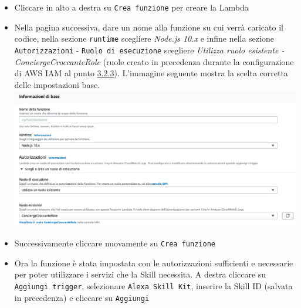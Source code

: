 \begin{itemize}
	\item Cliccare in alto a destra su \texttt{Crea funzione} per creare la Lambda
	\item Nella pagina successiva, dare un nome alla funzione su cui verrà caricato il codice, nella sezione \texttt{runtime} scegliere \textit{Node.js 10.x} e infine nella sezione \texttt{Autorizzazioni} - \texttt{Ruolo di esecuzione} scegliere \textit{Utilizza ruolo esistente - ConciergeCroccanteRole} (ruole creato in precedenza durante la configurazione di AWS IAM al punto \hyperref[aws-iam]{3.2.3}). L'immagine seguente mostra la scelta corretta delle impostazioni base.\\[0.3cm]
	\includegraphics[width=13cm]{immagini/aws-lambda2}
	\item Successivamente cliccare nuovamente su \texttt{Crea funzione}
	\item Ora la funzione è stata impostata con le autorizzazioni sufficienti e necessarie per poter utilizzare i servizi che la Skill necessita. A destra cliccare su \texttt{Aggiungi trigger}, selezionare \texttt{Alexa Skill Kit}, inserire la Skill ID (salvata in precedenza) e cliccare su \texttt{Aggiungi} 
\end{itemize}
